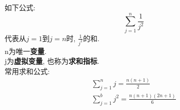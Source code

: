 \documentclass[UTF8, fontset=ubuntu]{ctexart}
\begin{document}
如下公式:\\
\[\sum_{j=1}^n\frac{1}{j^2}\]
代表从$j=1$到$j=n$时, $\displaystyle\frac{1}{j^2}$的和.\\
n为唯一\textbf{变量}.\\
j为\textbf{虚拟变量}, 也称为\textbf{求和指标}.\\[2ex]

常用求和公式:
\begin{gather}
\sum_{j=1}^n j=\frac{n(n+1)}{2}\\
\sum_{j=1}^b j^2=\frac{n(n+1)(2n+1)}{6}
\end{gather}
\end{document}
